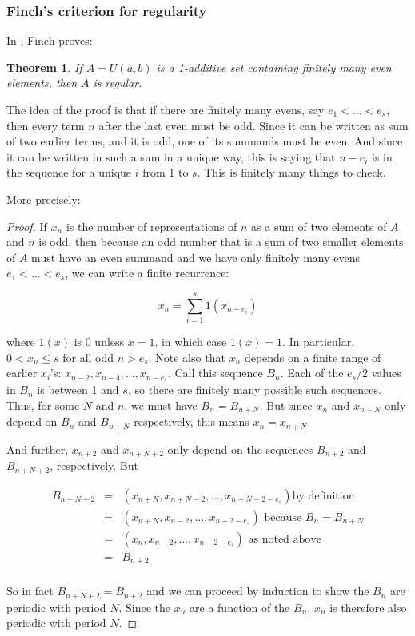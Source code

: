 \documentclass{article}
\newtheorem{theorem}{Theorem}[section]
\theoremstyle{definition}
\theoremstyle{remark}
\numberwithin{equation}{section}
\begin{document}
\subsubsection{Finch's criterion for regularity}

In \cite{finch:em1992}, Finch proves:

\begin{theorem}
If $A = U(a,b)$ is a 1-additive set containing finitely many even
elements, then $A$ is regular.  
\end{theorem}

The idea of the proof is that if there are finitely many evens, say
$e_1 < \ldots < e_s$, then every term $n$ after the last even must be
odd.  Since it can be written as sum of two earlier terms, and it is
odd, one of its summands must be even.  And since it can be written in
such a sum in a unique way, this is saying that $n - e_i$ is in the
sequence for a unique $i$ from 1 to $s$.  This is finitely many things
to check.

More precisely:

\begin{proof}

  If $x_n$ is the number of representations of $n$ as a sum of two
  elements of $A$ and $n$ is odd, then because an odd number that is a
  sum of two smaller elements of $A$ must have an even summand and we
  have only finitely many evens $e_1 < \ldots < e_s$, we can write a
  finite recurrence:

  \[x_n = \sum_{i=1}^s 1(x_{n-e_i})\]
  
  where $1(x)$ is 0 unless $x = 1$, in which case $1(x) = 1$.  In
  particular, $0 < x_n \leq s$ for all odd $n > e_s$.  Note also that
  $x_n$ depends on a finite range of earlier $x_i$'s:
  $x_{n-2}, x_{n-4}, \ldots, x_{n-e_s}$.  Call this sequence $B_n$.
  Each of the $e_s/2$ values in $B_n$ is between 1 and $s$, so there
  are finitely many possible such sequences.  Thus, for some $N$ and
  $n$, we must have $B_n = B_{n+N}$.  But since $x_n$ and $x_{n+N}$
  only depend on $B_n$ and $B_{n+N}$ respectively, this means
  $x_n = x_{n+N}$.

  And further, $x_{n+2}$ and $x_{n+N+2}$ only depend on the sequences
  $B_{n+2}$ and $B_{n+N+2}$, respectively.  But 

  \begin{eqnarray*}
    B_{n+N+2} &=& (x_{n+N}, x_{n+N-2}, \ldots, x_{n+N+2-e_s}) \text{
    by definition}\\
    &=& (x_{n+N}, x_{n-2}, \ldots, x_{n+2-e_s}) \text{ because $B_n
                                                  = B_{n+N}$}\\
    &=& (x_{n}, x_{n-2}, \ldots, x_{n+2-e_s}) \text{ as noted
                                                above}\\
              &=& B_{n+2}\\
  \end{eqnarray*}

  So in fact $B_{n+N+2} = B_{n+2}$ and we can proceed by induction to
  show the $B_n$ are periodic with period $N$.  Since the $x_n$ are a
  function of the $B_n$, $x_n$ is therefore also periodic with period
  $N$.
\end{proof}
\end{document}
